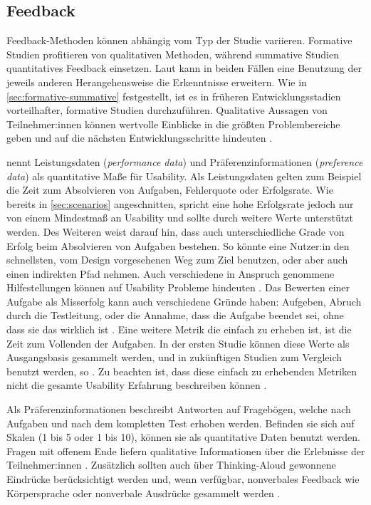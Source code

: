 \subsection{Feedback}
\label{sec:feedback}

Feedback-Methoden können abhängig vom Typ der Studie variieren. Formative Studien profitieren von qualitativen Methoden, während summative Studien quantitatives Feedback einsetzen. Laut \textcite{barnumUsabilityTesting2021} kann in beiden Fällen eine Benutzung der jeweils anderen Herangehensweise die Erkenntnisse erweitern. Wie in \ref{sec:formative-summative} festgestellt, ist es in früheren Entwicklungsstadien vorteilhafter, formative Studien durchzuführen. Qualitative Aussagen von Teilnehmer:innen können wertvolle Einblicke in die größten Problembereiche geben und auf die nächsten Entwicklungsschritte hindeuten \parencite{barnumUsabilityTesting2021}.

\textcite{barnumUsabilityTesting2021} nennt Leistungsdaten (\textit{performance data}) und Präferenzinformationen (\textit{preference data}) als quantitative Maße für Usability. Als Leistungsdaten gelten zum Beispiel die Zeit zum Absolvieren von Aufgaben, Fehlerquote oder Erfolgsrate. Wie bereits in \ref{sec:scenarios} angeschnitten, spricht eine hohe Erfolgsrate jedoch nur von einem Mindestmaß an Usability und sollte durch weitere Werte unterstützt werden. Des Weiteren weist \textcite{barnumUsabilityTesting2021} darauf hin, dass auch unterschiedliche Grade von Erfolg beim Absolvieren von Aufgaben bestehen. So könnte eine Nutzer:in den schnellsten, vom Design vorgesehenen Weg zum Ziel benutzen, oder aber auch einen indirekten Pfad nehmen. Auch verschiedene in Anspruch genommene Hilfestellungen können auf Usability Probleme hindeuten \parencite{barnumUsabilityTesting2021}. Das Bewerten einer Aufgabe als Misserfolg kann auch verschiedene Gründe haben: Aufgeben, Abruch durch die Testleitung, oder die Annahme, dass die Aufgabe beendet sei, ohne dass sie das wirklich ist \parencite{barnumUsabilityTesting2021}. Eine weitere Metrik die einfach zu erheben ist, ist die Zeit zum Vollenden der Aufgaben. In der ersten Studie können diese Werte als Ausgangsbasis gesammelt werden, und in zukünftigen Studien zum Vergleich benutzt werden, so \textcite{barnumUsabilityTesting2021}. Zu beachten ist, dass diese einfach zu erhebenden Metriken nicht die gesamte Usability Erfahrung beschreiben können \parencite{barnumUsabilityTesting2021}.

Als Präferenzinformationen beschreibt \textcite{barnumUsabilityTesting2021} Antworten auf Fragebögen, welche nach Aufgaben und nach dem kompletten Test erhoben werden. Befinden sie sich auf Skalen (1 bis 5 oder 1 bis 10), können sie als quantitative Daten benutzt werden. Fragen mit offenem Ende liefern qualitative Informationen über die Erlebnisse der Teilnehmer:innen \parencite{barnumUsabilityTesting2021}. Zusätzlich sollten auch über Thinking-Aloud gewonnene Eindrücke berücksichtigt werden und, wenn verfügbar, nonverbales Feedback wie Körpersprache oder nonverbale Ausdrücke gesammelt werden \parencite{barnumUsabilityTesting2021}.

